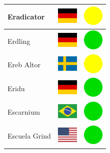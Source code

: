 \documentclass[12pt, a4paper, twoside]{report}
\begin{document}
\begin{center}
\begin{longtable}{|p{5cm}|p{2cm}|p{2cm}|}
 Eradicator                                                 & \includegraphics[width=1cm]{../img/flags/de} &   \includegraphics[width=1cm]{../likes/m} \\ \hline
 Erdling                                                    & \includegraphics[width=1cm]{../img/flags/de} &   \includegraphics[width=1cm]{../likes/y} \\ \hline
 Ereb Altor                                                 & \includegraphics[width=1cm]{../img/flags/se} &   \includegraphics[width=1cm]{../likes/m} \\ \hline
 Eridu                                                      & \includegraphics[width=1cm]{../img/flags/de} &   \includegraphics[width=1cm]{../likes/y} \\ \hline
 Escarnium                                                  & \includegraphics[width=1cm]{../img/flags/br} &   \includegraphics[width=1cm]{../likes/y} \\ \hline
 Escuela Grind                                              & \includegraphics[width=1cm]{../img/flags/us} &   \includegraphics[width=1cm]{../likes/y} \\ \hline

\end{longtable}
\end{center}
\end{document}
